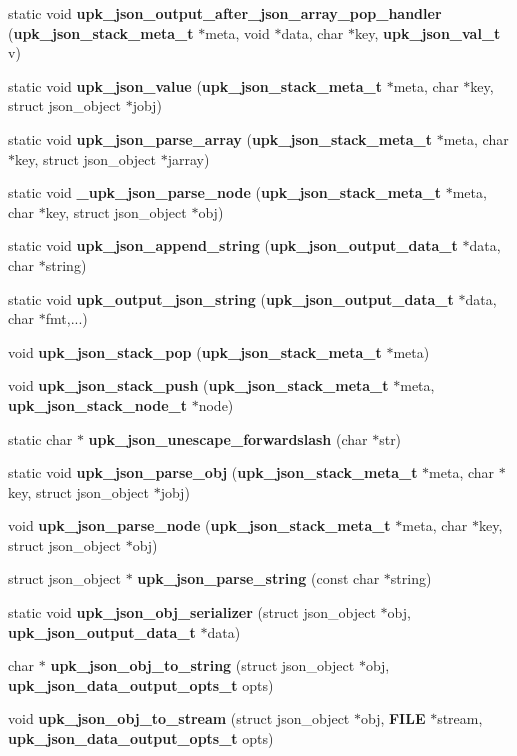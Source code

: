 \begin{DoxyCompactItemize}
\item 
static void {\bf upk\_\-json\_\-output\_\-after\_\-json\_\-array\_\-pop\_\-handler} ({\bf upk\_\-json\_\-stack\_\-meta\_\-t} $\ast$meta, void $\ast$data, char $\ast$key, {\bf upk\_\-json\_\-val\_\-t} v)
\item 
static void {\bf upk\_\-json\_\-value} ({\bf upk\_\-json\_\-stack\_\-meta\_\-t} $\ast$meta, char $\ast$key, struct json\_\-object $\ast$jobj)
\item 
static void {\bf upk\_\-json\_\-parse\_\-array} ({\bf upk\_\-json\_\-stack\_\-meta\_\-t} $\ast$meta, char $\ast$key, struct json\_\-object $\ast$jarray)
\item 
static void {\bf \_\-upk\_\-json\_\-parse\_\-node} ({\bf upk\_\-json\_\-stack\_\-meta\_\-t} $\ast$meta, char $\ast$key, struct json\_\-object $\ast$obj)
\item 
static void {\bf upk\_\-json\_\-append\_\-string} ({\bf upk\_\-json\_\-output\_\-data\_\-t} $\ast$data, char $\ast$string)
\item 
static void {\bf upk\_\-output\_\-json\_\-string} ({\bf upk\_\-json\_\-output\_\-data\_\-t} $\ast$data, char $\ast$fmt,...)
\item 
void {\bf upk\_\-json\_\-stack\_\-pop} ({\bf upk\_\-json\_\-stack\_\-meta\_\-t} $\ast$meta)
\item 
void {\bf upk\_\-json\_\-stack\_\-push} ({\bf upk\_\-json\_\-stack\_\-meta\_\-t} $\ast$meta, {\bf upk\_\-json\_\-stack\_\-node\_\-t} $\ast$node)
\item 
static char $\ast$ {\bf upk\_\-json\_\-unescape\_\-forwardslash} (char $\ast$str)
\item 
static void {\bf upk\_\-json\_\-parse\_\-obj} ({\bf upk\_\-json\_\-stack\_\-meta\_\-t} $\ast$meta, char $\ast$key, struct json\_\-object $\ast$jobj)
\item 
void {\bf upk\_\-json\_\-parse\_\-node} ({\bf upk\_\-json\_\-stack\_\-meta\_\-t} $\ast$meta, char $\ast$key, struct json\_\-object $\ast$obj)
\item 
struct json\_\-object $\ast$ {\bf upk\_\-json\_\-parse\_\-string} (const char $\ast$string)
\item 
static void {\bf upk\_\-json\_\-obj\_\-serializer} (struct json\_\-object $\ast$obj, {\bf upk\_\-json\_\-output\_\-data\_\-t} $\ast$data)
\item 
char $\ast$ {\bf upk\_\-json\_\-obj\_\-to\_\-string} (struct json\_\-object $\ast$obj, {\bf upk\_\-json\_\-data\_\-output\_\-opts\_\-t} opts)
\item 
void {\bf upk\_\-json\_\-obj\_\-to\_\-stream} (struct json\_\-object $\ast$obj, {\bf FILE} $\ast$stream, {\bf upk\_\-json\_\-data\_\-output\_\-opts\_\-t} opts)
\end{DoxyCompactItemize}


